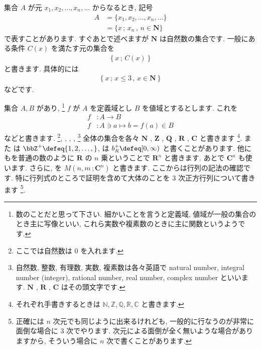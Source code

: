 \documentclass[openany, a4paper, oneside]{jsbook}
\begin{document}
集合 $A$ が元 $x_{1},x_{2},\dots,x_{n},\dots$ からなるとき, 記号
\begin{align}
    A &= \{ x_{1},x_{2},\dots,x_{n},\dots \}  \\
    &= \{ x \, ; \, x_{n}\, , \, n\in \bm{N} \}
\end{align}
で表すことがあります. すぐあとで述べますが $\bm{N}$ は自然数の集合です.
一般にある条件 $C (x)$ を満たす元の集合を
\begin{align}
    \left \{ x \, ; \, C (x) \right \}
\end{align}
と書きます. 具体的には
\begin{align}
    \left \{ x \, ; \, x \leq 3\, , \, x \in \bm{N} \right \}
\end{align}
などです.



集合 $A,B$ があり,  \footnote{数のことだと思って下さい.
細かいことを言うと定義域, 値域が一般の集合のとき主に写像といい,
これら実数や複素数のときに主に関数というようです.}
$f$ が $A$ を定義域とし $B$ を値域とするとします.
これを
\begin{align}
f &:  A \rightarrow B \\
f &: A\ni  a \mapsto     b=f (a)\in B
\end{align}
などと書きます.
 \footnote{ここでは自然数は $0$ を入れます.}, , ,
,  \footnote{自然数, 整数, 有理数, 実数, 複素数は各々英語で natural number, integral number (integer),
rational number, real number, complex number といいます.  $\bm{N}$ ,  $\bm{R}$ ,  $\bm{C}$ はその頭文字です.}
全体の集合を各々
$\bm{N}$ ,  $\bm{Z}$ ,  $\bm{Q}$ ,  $\bm{R}$ ,  $\bm{C}$ と書きます \footnote{それぞれ手書きするときは $\mathbb{N},\mathbb{Z},\mathbb{Q},\mathbb{R},\mathbb{C}$ と書きます.}.
また
は
$\bbZ^+ \defeq \{ 1, 2 , \dots , \}$,
は
 $b_R^+ \defeq [ 0 , \infty )$
と書くことがあります.
他にもを普通の数のように $\bm{R}$ の $n$ 乗ということで $\bm{R}^{n}$ と書きます.
あとで $\bm{C}^{n}$ も使います.
さらに, を $M \left ( n,m \, ;\bm{C}^n \right)$ と書きます.
ここからは行列の記法の確認です. 特に行列式のところで証明を含めて大体のことを 3 次正方行列について書きます \footnote{正確には $n$ 次元でも同じように出来るけれども, 一般的に行なうのが非常に面倒な場合に 3 次でやります.
次元による面倒が全く無いような場合がありますから, そういう場合に $n$ 次で書くことがあります.}.
\end{document}
